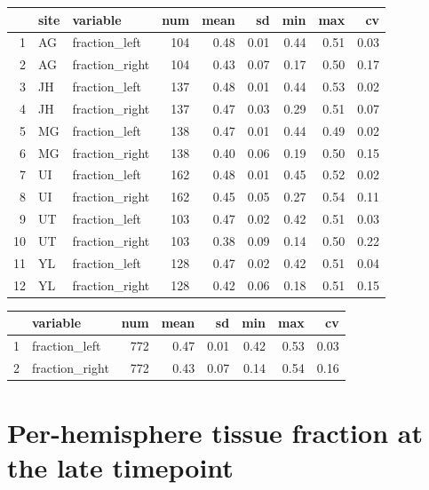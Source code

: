 \documentclass[
]{article}
\begin{document}
\begin{table}[ht]
\centering
\begin{tabular}{rllrrrrrr}
  \hline
 & site & variable & num & mean & sd & min & max & cv \\ 
  \hline
1 & AG & fraction\_left & 104 & 0.48 & 0.01 & 0.44 & 0.51 & 0.03 \\ 
  2 & AG & fraction\_right & 104 & 0.43 & 0.07 & 0.17 & 0.50 & 0.17 \\ 
  3 & JH & fraction\_left & 137 & 0.48 & 0.01 & 0.44 & 0.53 & 0.02 \\ 
  4 & JH & fraction\_right & 137 & 0.47 & 0.03 & 0.29 & 0.51 & 0.07 \\ 
  5 & MG & fraction\_left & 138 & 0.47 & 0.01 & 0.44 & 0.49 & 0.02 \\ 
  6 & MG & fraction\_right & 138 & 0.40 & 0.06 & 0.19 & 0.50 & 0.15 \\ 
  7 & UI & fraction\_left & 162 & 0.48 & 0.01 & 0.45 & 0.52 & 0.02 \\ 
  8 & UI & fraction\_right & 162 & 0.45 & 0.05 & 0.27 & 0.54 & 0.11 \\ 
  9 & UT & fraction\_left & 103 & 0.47 & 0.02 & 0.42 & 0.51 & 0.03 \\ 
  10 & UT & fraction\_right & 103 & 0.38 & 0.09 & 0.14 & 0.50 & 0.22 \\ 
  11 & YL & fraction\_left & 128 & 0.47 & 0.02 & 0.42 & 0.51 & 0.04 \\ 
  12 & YL & fraction\_right & 128 & 0.42 & 0.06 & 0.18 & 0.51 & 0.15 \\ 
   \hline
\end{tabular}
\end{table}
\begin{table}[ht]
\centering
\begin{tabular}{rlrrrrrr}
  \hline
 & variable & num & mean & sd & min & max & cv \\ 
  \hline
1 & fraction\_left & 772 & 0.47 & 0.01 & 0.42 & 0.53 & 0.03 \\ 
  2 & fraction\_right & 772 & 0.43 & 0.07 & 0.14 & 0.54 & 0.16 \\ 
   \hline
\end{tabular}
\end{table}

\hypertarget{per-hemisphere-tissue-fraction-at-the-late-timepoint}{%
\section{Per-hemisphere tissue fraction at the late
timepoint}\label{per-hemisphere-tissue-fraction-at-the-late-timepoint}}
\end{document}
